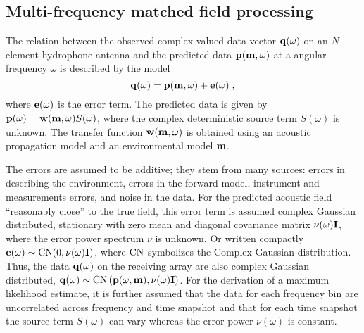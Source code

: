 \documentclass{saclantc}
\begin{document}
\subsection{Multi-frequency matched field processing}
\label{se:mfp}

The relation between the observed complex-valued data vector ${\bf q}(\omega)$ 
on an $N$-element hydrophone antenna and the predicted data
${\bf p}({\bf m}, \omega)$ at a angular frequency $\omega $ 
is described by the model
\begin{equation}
 {\bf q}(\omega) = {\bf p}( {\bf m}, \omega )+ {\bf e}(\omega)\;,
\end{equation}
where $ {\bf e}(\omega)$ is  the error term. The predicted data is
given by ${\bf p}(\omega )= {\bf w}( {\bf m}, \omega)S(\omega) $, where the
complex deterministic source term $S(\omega)$ is unknown.  The
transfer function $ {\bf w}( {\bf m}, \omega)$ 
is obtained using an acoustic propagation model and
an environmental model $\bf m $.

The errors are  assumed to be additive;  they
 stem from many sources: errors in describing the
environment, errors in the forward model, instrument and
measurements errors, and noise in the data.  For the predicted
acoustic field
``reasonably close'' to the true field, this error term is
assumed complex Gaussian distributed, stationary
 with zero mean and diagonal covariance matrix
$\nu (\omega ){\bf I}$, where the error  power spectrum $\nu $ is unknown.
Or written compactly ${\bf e}(\omega) \sim {\rm CN}(0,{\nu (\omega
){\bf I}})$, where $ {\rm CN}$ symbolizes the Complex Gaussian distribution.
 Thus, the data ${\bf q}(\omega)$ on the receiving array are also 
complex Gaussian distributed,
${\bf q}(\omega) \sim {\rm CN}\left({\bf p}(\omega,{\bf m}),
                   \nu (\omega){\bf I}\right)$. 
For the derivation of a maximum likelihood estimate, it is further
assumed that the data for each frequency bin are uncorrelated across
frequency and time snapshot and that for each time snapshot the source term
$S( \omega)$ can vary whereas the error power $\nu (\omega )$ is constant.
\end{document}
